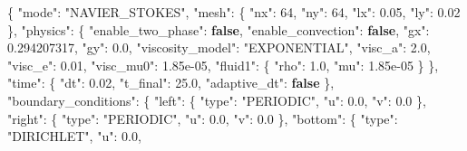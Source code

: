 \documentclass[
  10pt,
]{article}
\newenvironment{Shaded}{}{}
\newcommand{\DataTypeTok}[1]{\textcolor[rgb]{0.56,0.13,0.00}{#1}}
\newcommand{\DecValTok}[1]{\textcolor[rgb]{0.25,0.63,0.44}{#1}}
\newcommand{\FloatTok}[1]{\textcolor[rgb]{0.25,0.63,0.44}{#1}}
\newcommand{\FunctionTok}[1]{\textcolor[rgb]{0.02,0.16,0.49}{#1}}
\newcommand{\KeywordTok}[1]{\textcolor[rgb]{0.00,0.44,0.13}{\textbf{#1}}}
\newcommand{\StringTok}[1]{\textcolor[rgb]{0.25,0.44,0.63}{#1}}
\begin{document}
\begin{Shaded}
\begin{Highlighting}[]
\FunctionTok{\{}
  \DataTypeTok{"mode"}\FunctionTok{:} \StringTok{"NAVIER\_STOKES"}\FunctionTok{,}
  \DataTypeTok{"mesh"}\FunctionTok{:} \FunctionTok{\{}
    \DataTypeTok{"nx"}\FunctionTok{:} \DecValTok{64}\FunctionTok{,}
    \DataTypeTok{"ny"}\FunctionTok{:} \DecValTok{64}\FunctionTok{,}
    \DataTypeTok{"lx"}\FunctionTok{:} \FloatTok{0.05}\FunctionTok{,}
    \DataTypeTok{"ly"}\FunctionTok{:} \FloatTok{0.02}
  \FunctionTok{\},}
  \DataTypeTok{"physics"}\FunctionTok{:} \FunctionTok{\{}
    \DataTypeTok{"enable\_two\_phase"}\FunctionTok{:} \KeywordTok{false}\FunctionTok{,}
    \DataTypeTok{"enable\_convection"}\FunctionTok{:} \KeywordTok{false}\FunctionTok{,}
    \DataTypeTok{"gx"}\FunctionTok{:} \FloatTok{0.294207317}\FunctionTok{,}
    \DataTypeTok{"gy"}\FunctionTok{:} \FloatTok{0.0}\FunctionTok{,}
    \DataTypeTok{"viscosity\_model"}\FunctionTok{:} \StringTok{"EXPONENTIAL"}\FunctionTok{,}
    \DataTypeTok{"visc\_a"}\FunctionTok{:} \FloatTok{2.0}\FunctionTok{,}
    \DataTypeTok{"visc\_e"}\FunctionTok{:} \FloatTok{0.01}\FunctionTok{,}
    \DataTypeTok{"visc\_mu0"}\FunctionTok{:} \FloatTok{1.85e{-}05}\FunctionTok{,}
    \DataTypeTok{"fluid1"}\FunctionTok{:} \FunctionTok{\{}
      \DataTypeTok{"rho"}\FunctionTok{:} \FloatTok{1.0}\FunctionTok{,}
      \DataTypeTok{"mu"}\FunctionTok{:} \FloatTok{1.85e{-}05}
    \FunctionTok{\}}
  \FunctionTok{\},}
  \DataTypeTok{"time"}\FunctionTok{:} \FunctionTok{\{}
    \DataTypeTok{"dt"}\FunctionTok{:} \FloatTok{0.02}\FunctionTok{,}
    \DataTypeTok{"t\_final"}\FunctionTok{:} \FloatTok{25.0}\FunctionTok{,}
    \DataTypeTok{"adaptive\_dt"}\FunctionTok{:} \KeywordTok{false}
  \FunctionTok{\},}
  \DataTypeTok{"boundary\_conditions"}\FunctionTok{:} \FunctionTok{\{}
    \DataTypeTok{"left"}\FunctionTok{:} \FunctionTok{\{}
      \DataTypeTok{"type"}\FunctionTok{:} \StringTok{"PERIODIC"}\FunctionTok{,}
      \DataTypeTok{"u"}\FunctionTok{:} \FloatTok{0.0}\FunctionTok{,}
      \DataTypeTok{"v"}\FunctionTok{:} \FloatTok{0.0}
    \FunctionTok{\},}
    \DataTypeTok{"right"}\FunctionTok{:} \FunctionTok{\{}
      \DataTypeTok{"type"}\FunctionTok{:} \StringTok{"PERIODIC"}\FunctionTok{,}
      \DataTypeTok{"u"}\FunctionTok{:} \FloatTok{0.0}\FunctionTok{,}
      \DataTypeTok{"v"}\FunctionTok{:} \FloatTok{0.0}
    \FunctionTok{\},}
    \DataTypeTok{"bottom"}\FunctionTok{:} \FunctionTok{\{}
      \DataTypeTok{"type"}\FunctionTok{:} \StringTok{"DIRICHLET"}\FunctionTok{,}
      \DataTypeTok{"u"}\FunctionTok{:} \FloatTok{0.0}\FunctionTok{,}

\end{Highlighting}
\end{Shaded}
\end{document}
